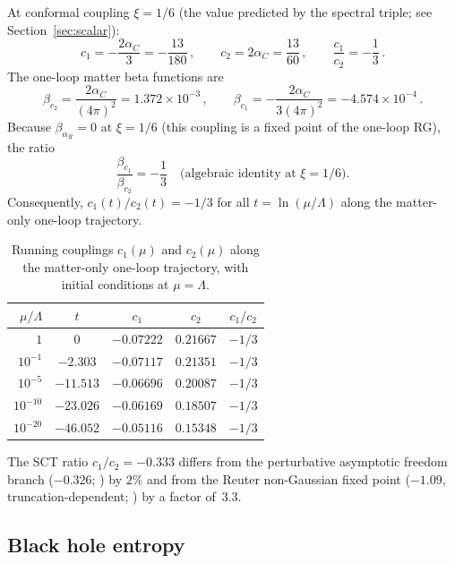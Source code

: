 \documentclass[12pt,a4paper]{article}
\theoremstyle{plain}
\theoremstyle{definition}
\theoremstyle{remark}
\begin{document}
At conformal coupling $\xi = 1/6$ (the value predicted by the
spectral triple; see Section~\ref{sec:scalar}):
\begin{equation}\label{eq:c1c2}
  c_1 = -\frac{2\alpha_C}{3} = -\frac{13}{180}\,,\qquad
  c_2 = 2\alpha_C = \frac{13}{60}\,,\qquad
  \frac{c_1}{c_2} = -\frac{1}{3}\,.
\end{equation}
The one-loop matter beta functions are
\begin{equation}\label{eq:betas}
  \beta_{c_2} = \frac{2\alpha_C}{(4\pi)^2}
  = 1.372 \times 10^{-3}\,,\qquad
  \beta_{c_1} = -\frac{2\alpha_C}{3(4\pi)^2}
  = -4.574 \times 10^{-4}\,.
\end{equation}
Because $\beta_{\alpha_R} = 0$ at $\xi = 1/6$ (this coupling
is a fixed point of the one-loop RG), the ratio
\begin{equation}\label{eq:ratio-frozen}
  \frac{\beta_{c_1}}{\beta_{c_2}} = -\frac{1}{3}
  \quad\text{(algebraic identity at $\xi = 1/6$)}.
\end{equation}
Consequently, $c_1(t)/c_2(t) = -1/3$ for all $t = \ln(\mu/\Lambda)$
along the matter-only one-loop trajectory.

\begin{table}[ht]
\centering
\caption{Running couplings $c_1(\mu)$ and $c_2(\mu)$ along the
matter-only one-loop trajectory, with initial conditions at
$\mu = \Lambda$.}
\label{tab:running}
\begin{tabular}{rcccc}
\toprule
$\mu/\Lambda$ & $t$ & $c_1$ & $c_2$ & $c_1/c_2$ \\
\midrule
$1$ & $0$ & $-0.07222$ & $0.21667$ & $-1/3$ \\
$10^{-1}$ & $-2.303$ & $-0.07117$ & $0.21351$ & $-1/3$ \\
$10^{-5}$ & $-11.513$ & $-0.06696$ & $0.20087$ & $-1/3$ \\
$10^{-10}$ & $-23.026$ & $-0.06169$ & $0.18507$ & $-1/3$ \\
$10^{-20}$ & $-46.052$ & $-0.05116$ & $0.15348$ & $-1/3$ \\
\bottomrule
\end{tabular}
\end{table}

The SCT ratio $c_1/c_2 = -0.333$ differs from the
perturbative asymptotic freedom branch ($-0.326$;
\cite{Shapiro:2004}) by $2\%$ and from the Reuter non-Gaussian
fixed point ($-1.09$, truncation-dependent; \cite{BMS:2009})
by a factor of~$3.3$.

\subsection{Black hole entropy}
\label{sec:clog}
\end{document}
